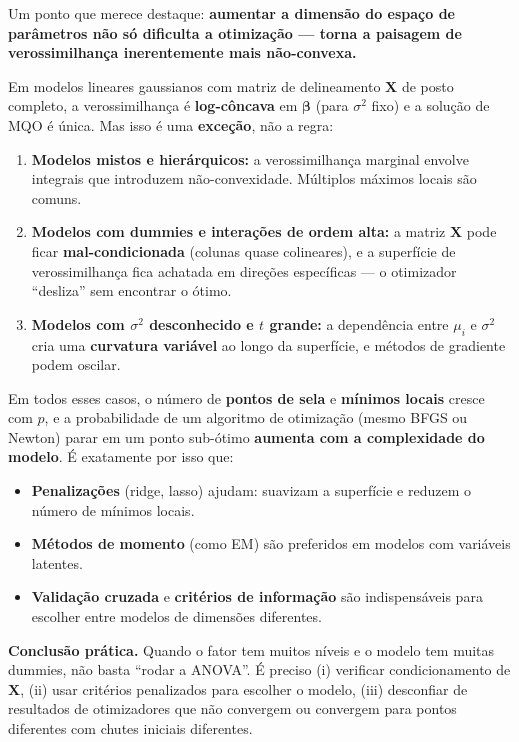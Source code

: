 \documentclass[
]{article}
\providecommand{\tightlist}{%
  \setlength{\itemsep}{0pt}\setlength{\parskip}{0pt}}
\begin{document}
Um ponto que merece destaque: \textbf{aumentar a dimensão do espaço de
parâmetros não só dificulta a otimização --- torna a paisagem de
verossimilhança inerentemente mais não-convexa.}

Em modelos lineares gaussianos com matriz de delineamento \(\mathbf{X}\)
de posto completo, a verossimilhança é \textbf{log-côncava} em
\(\boldsymbol\beta\) (para \(\sigma^2\) fixo) e a solução de MQO é
única. Mas isso é uma \textbf{exceção}, não a regra:

\begin{enumerate}
\def\labelenumi{\arabic{enumi}.}
\tightlist
\item
  \textbf{Modelos mistos e hierárquicos:} a verossimilhança marginal
  envolve integrais que introduzem não-convexidade. Múltiplos máximos
  locais são comuns.
\item
  \textbf{Modelos com dummies e interações de ordem alta:} a matriz
  \(\mathbf{X}\) pode ficar \textbf{mal-condicionada} (colunas quase
  colineares), e a superfície de verossimilhança fica achatada em
  direções específicas --- o otimizador ``desliza'' sem encontrar o
  ótimo.
\item
  \textbf{Modelos com \(\sigma^2\) desconhecido e \(t\) grande:} a
  dependência entre \(\mu_i\) e \(\sigma^2\) cria uma \textbf{curvatura
  variável} ao longo da superfície, e métodos de gradiente podem
  oscilar.
\end{enumerate}

Em todos esses casos, o número de \textbf{pontos de sela} e
\textbf{mínimos locais} cresce com \(p\), e a probabilidade de um
algoritmo de otimização (mesmo BFGS ou Newton) parar em um ponto
sub-ótimo \textbf{aumenta com a complexidade do modelo}. É exatamente
por isso que:

\begin{itemize}
\tightlist
\item
  \textbf{Penalizações} (ridge, lasso) ajudam: suavizam a superfície e
  reduzem o número de mínimos locais.
\item
  \textbf{Métodos de momento} (como EM) são preferidos em modelos com
  variáveis latentes.
\item
  \textbf{Validação cruzada} e \textbf{critérios de informação} são
  indispensáveis para escolher entre modelos de dimensões diferentes.
\end{itemize}

\textbf{Conclusão prática.} Quando o fator tem muitos níveis e o modelo
tem muitas dummies, não basta ``rodar a ANOVA''. É preciso (i) verificar
condicionamento de \(\mathbf{X}\), (ii) usar critérios penalizados para
escolher o modelo, (iii) desconfiar de resultados de otimizadores que
não convergem ou convergem para pontos diferentes com chutes iniciais
diferentes.
\end{document}
